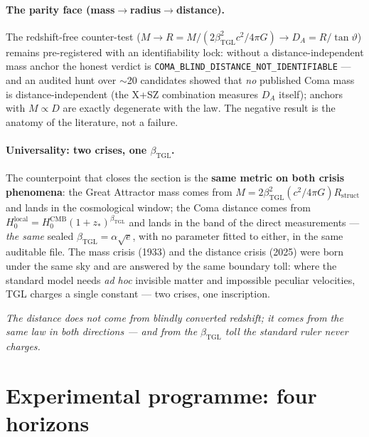\documentclass[11pt]{article}
\newcommand{\bTGL}{\beta_{\mathrm{TGL}}}\newcommand{\Msun}{M_{\odot}}\newcommand{\TGL}{\mathrm{TGL}}
\theoremstyle{definition}\newtheorem{deriv}{Derivation}
\begin{document}
\paragraph{The parity face (mass$\to$radius$\to$distance).} The redshift-free counter-test ($M\to R=M/(2\bTGL^2 c^2/4\pi G)\to D_A=R/\tan\vartheta$) remains pre-registered with an identifiability lock: without a distance-independent mass anchor the honest verdict is \texttt{COMA\_BLIND\_DISTANCE\_NOT\_IDENTIFIABLE} --- and an audited hunt over $\sim$20 candidates showed that \emph{no} published Coma mass is distance-independent (the X+SZ combination measures $D_A$ itself); anchors with $M\propto D$ are exactly degenerate with the law. The negative result is the anatomy of the literature, not a failure.

\paragraph{Universality: two crises, one $\bTGL$.} The counterpoint that closes the section is the \textbf{same metric on both crisis phenomena}: the Great Attractor mass comes from $M=2\bTGL^2(c^2/4\pi G)R_{\mathrm{struct}}$ and lands in the cosmological window; the Coma distance comes from $H_0^{\mathrm{local}}=H_0^{\mathrm{CMB}}(1+z_*)^{\bTGL}$ and lands in the band of the direct measurements --- \emph{the same} sealed $\bTGL=\alpha\sqrt e$, with no parameter fitted to either, in the same auditable file. The mass crisis (1933) and the distance crisis (2025) were born under the same sky and are answered by the same boundary toll: where the standard model needs \emph{ad hoc} invisible matter and impossible peculiar velocities, TGL charges a single constant --- two crises, one inscription.

\emph{The distance does not come from blindly converted redshift; it comes from the same law in both directions --- and from the $\bTGL$ toll the standard ruler never charges.}

\section{Experimental programme: four horizons}\label{sec:horizons}
\end{document}

